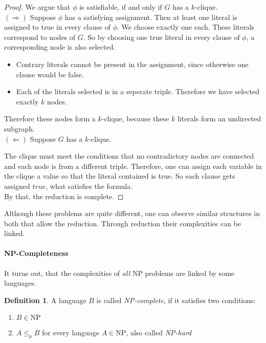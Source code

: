 \documentclass[10pt,fleqn]{article}
\theoremstyle{definition}
\newtheorem{definition}{Definition}
\theoremstyle{remark}
\newcommand{\npclass}{\text{NP}}
\begin{document}
\begin{proof}
    We argue that \(\phi\) is satisfiable, if and only if \(G\) has a \(k\)-clique.\\

    \((\Rightarrow)\) Suppose \(\phi\) has a satisfying assignment. Then at least one literal is assigned to true in every clause of \(\phi\). We choose exactly one each. These literals correspond to nodes of \(G\). So by choosing one true literal in every clause of \(\phi\), a corresponding node is also selected.

    \begin{itemize}
        \item Contrary literals cannot be present in the assignment, since otherwise one clause would be false.
        \item Each of the literals selected is in a seperate triple. Therefore we have selected exactly \(k\) nodes.
    \end{itemize}

    Therefore these nodes form a \(k\)-clique, because these \(k\) literals form an undirected subgraph.\\

    \((\Leftarrow)\) Suppose \(G\) has a \(k\)-clique.
    
    The clique must meet the conditions that no contradictory nodes are connected and each node is from a different triple. Therefore, one can assign each variable in the clique a value so that the literal contained is true. So each clause gets assigned \(true\), what satisfies the formula.\\

    By that, the reduction is complete.
\end{proof}

Although these problems are quite different, one can observe similar structures in both that allow the reduction. Through reduction their complexities can be linked.

\paragraph{NP-Completeness} It turns out, that the complexities of \emph{all} NP problems are linked by some languages.

\begin{definition} A language \(B\) is called \emph{NP-complete}, if it satisfies two conditions:
    \begin{enumerate}

        \item \(B \in \npclass\)

        \item \(A \leq_p B\) for every language \(A \in \npclass\), also called \emph{NP-hard}

    \end{enumerate}
\end{definition}
\end{document}
